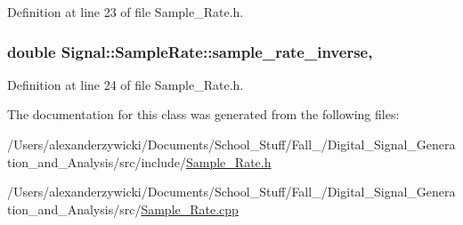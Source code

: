 Definition at line 23 of file Sample\+\_\+\+Rate.\+h.

\hypertarget{class_signal_1_1_sample_rate_a970e812aa9bcfe7a7f04a98df0b659bc}{
\subsubsection[{sample\+\_\+rate\+\_\+inverse}]{\setlength{\rightskip}{0pt plus 5cm}double Signal\+::\+Sample\+Rate\+::sample\+\_\+rate\+\_\+inverse\hspace{0.3cm}{\ttfamily [static]}, {\ttfamily [protected]}}}\label{class_signal_1_1_sample_rate_a970e812aa9bcfe7a7f04a98df0b659bc}


Definition at line 24 of file Sample\+\_\+\+Rate.\+h.



The documentation for this class was generated from the following files\+:\begin{DoxyCompactItemize}
\item 
/\+Users/alexanderzywicki/\+Documents/\+School\+\_\+\+Stuff/\+Fall\+\_/\+Digital\+\_\+\+Signal\+\_\+\+Generation\+\_\+and\+\_\+\+Analysis/src/include/\hyperlink{_sample___rate_8h}{Sample\+\_\+\+Rate.\+h}\item 
/\+Users/alexanderzywicki/\+Documents/\+School\+\_\+\+Stuff/\+Fall\+\_/\+Digital\+\_\+\+Signal\+\_\+\+Generation\+\_\+and\+\_\+\+Analysis/src/\hyperlink{_sample___rate_8cpp}{Sample\+\_\+\+Rate.\+cpp}\end{DoxyCompactItemize}
